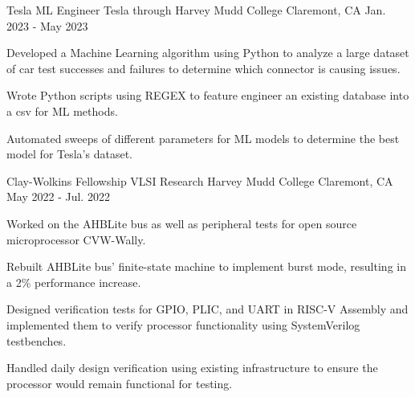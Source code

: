 \begin{cventries}
  \cventry
    {Tesla ML Engineer} %
    {Tesla through Harvey Mudd College} %
    {Claremont, CA} %
    {Jan. 2023 - May 2023} %
    {
      \begin{cvitems} %
        \item {
        Developed a Machine Learning algorithm using Python to analyze a large dataset of car test successes and failures to determine which connector is causing issues.
        }
        \item{
        Wrote Python scripts using REGEX to feature engineer an existing database into a csv for ML methods.
        }
        \item{
        Automated sweeps of different parameters for ML models to determine the best model for Tesla's dataset.
        }
      \end{cvitems}
    }

  \cventry
    {Clay-Wolkins Fellowship VLSI Research} %
    {Harvey Mudd College} %
    {Claremont, CA} %
    {May 2022 - Jul. 2022} %
    {
      \begin{cvitems} %
        \item {
        Worked on the AHBLite bus as well as peripheral tests for open source microprocessor CVW-Wally.
        }
        \item{
        Rebuilt AHBLite bus' finite-state machine to implement burst mode, resulting in a 2\% performance increase.
        }
        \item{
        Designed verification tests for GPIO, PLIC, and UART in RISC-V Assembly and implemented them to verify processor functionality using SystemVerilog testbenches.
        }
        \item{
        Handled daily design verification using existing infrastructure to ensure the processor would remain functional for testing.
        }
      \end{cvitems}
    }

\end{cventries}
